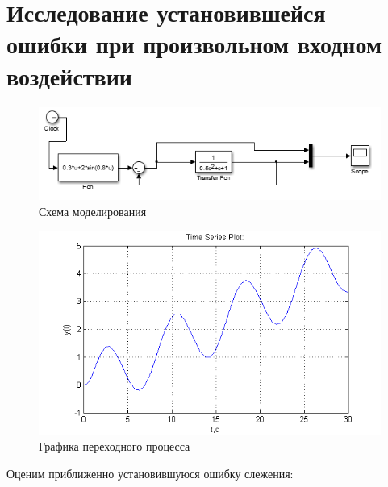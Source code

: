 \documentclass[a4paper, 11pt]{article}
\begin{document}
\section{Исследование установившейся ошибки при произвольном входном воздействии}\hfill\par
\begin{center}
	\begin{figure}[h]
		\centering
	\includegraphics[width=0.7\linewidth]{14}
		\caption{Схема моделирования}
		\label{fig:14}
	\end{figure}
\end{center}

\begin{figure}[h]
	\centering
	\includegraphics[width=0.7\linewidth]{15}
	\caption{Графика переходного процесса}
	\label{fig:15}
\end{figure}

Оценим приближенно установившуюся ошибку слежения:
\end{document}
